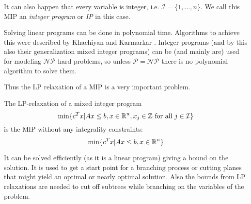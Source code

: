 It can also happen that every variable is integer, i.e. $\mathcal{I}=\{1,\dots, n\}$. We call this MIP an 
\textit{integer program} or \textit{IP} in this case.

Solving linear programs can be done in polynomial time. Algorithms to achieve this were described by 
Khachiyan\cite{KHACHIYAN198053} and Karmarkar \cite{Karmarkar:1984:NPA:800057.808695}. Integer programs (and by this 
also their generalization mixed integer programs) can be (and mainly are) used for modeling $\mathcal{NP}$ hard 
problems, so unless $\mathcal{P}=\mathcal{NP}$ there is no polynomial algorithm to solve them. 

Thus the LP relaxation of a MIP is a very important problem.
\begin{definition}
 The LP-relaxation of a mixed integer program 
 $$\min\{c^T x|Ax\le b, x\in\mathbb{R}^n, x_j\in\mathbb{Z}\textrm{ for all }j\in\mathcal{I} \}$$
 is the MIP without any integrality constraints:
 $$\min\{c^T x|Ax\le b, x\in\mathbb{R}^n \}$$
\end{definition}

It can be solved efficiently (as it is a linear program) giving a bound on the solution. It is used to get a start 
point for a branching process or cutting planes that might yield an optimal or nearly optimal solution. Also the bounds 
from LP relaxations are needed to cut off subtrees while branching on the variables of the problem.
